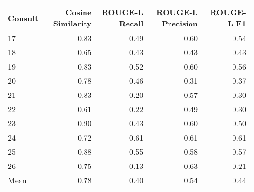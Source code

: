 \begin{tabular}{lrrrr}
\toprule
Consult & Cosine Similarity & ROUGE-L Recall & ROUGE-L Precision & ROUGE-L F1 \\
\midrule
17 & 0.83 & 0.49 & 0.60 & 0.54 \\
18 & 0.65 & 0.43 & 0.43 & 0.43 \\
19 & 0.83 & 0.52 & 0.60 & 0.56 \\
20 & 0.78 & 0.46 & 0.31 & 0.37 \\
21 & 0.83 & 0.20 & 0.57 & 0.30 \\
22 & 0.61 & 0.22 & 0.49 & 0.30 \\
23 & 0.90 & 0.43 & 0.60 & 0.50 \\
24 & 0.72 & 0.61 & 0.61 & 0.61 \\
25 & 0.88 & 0.55 & 0.58 & 0.57 \\
26 & 0.75 & 0.13 & 0.63 & 0.21 \\
Mean & 0.78 & 0.40 & 0.54 & 0.44 \\
\bottomrule
\end{tabular}
